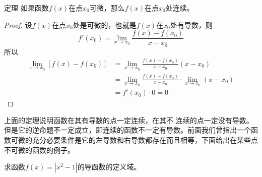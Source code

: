 \begin{blk}
    {定理} 如果函数$f(x)$在点$x_0$可微，那么$f(x)$在点$x_0$处连续。
\end{blk}

\begin{proof}
设$f(x)$在点$x_0$处是可微的，也就是$f(x)$在$x_0$处有导数，则
\[f'(x_0)=\lim_{x\to x_0}\frac{f(x)-f(x_0)}{x-x_0}\]
所以
\[\begin{split}
    \lim_{x\to x_0}[f(x)-f(x_0)]&=\lim_{x\to x_0}\frac{f(x)-f(x_0)}{x-x_0}(x-x_0)\\
    &=\lim_{x\to x_0}\frac{f(x)-f(x_0)}{x-x_0}\cdot \lim_{x\to x_0}(x-x_0)\\
&=f'(x_0)\cdot 0=0
\end{split}\]
\end{proof}

上面的定理说明函数在其有导数的点一定连续，在其不
连续的点一定没有导数。但是它的逆命题不一定成立，即连续的函数不一定有导数。前面我们曾指出一个函数可微的充分必要条件是它的左导数和右导数都存在而且相等，下面给出在某些点不可微的函数的例子。

\begin{example}
    求函数$f(x)=|x^2-1|$的导函数的定义域。
\end{example}


